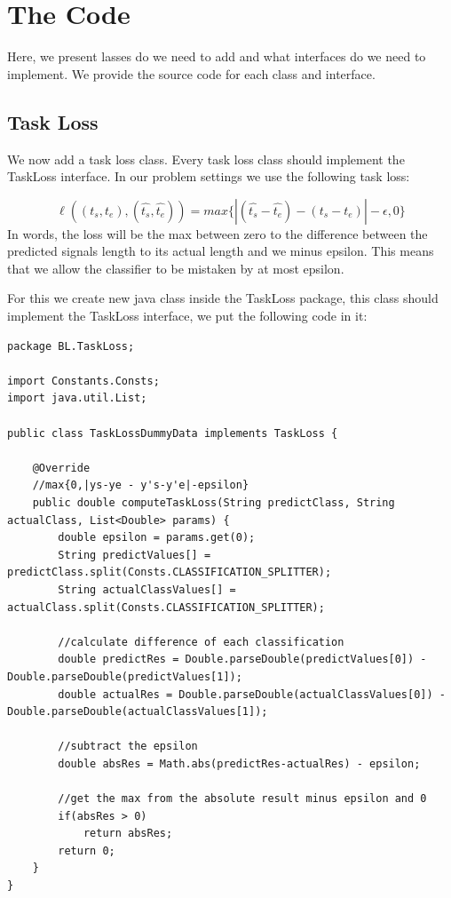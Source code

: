 \documentclass[11pt, oneside]{article}   	%
\begin{document}
\section{The Code}
Here, we present        lasses do we need to add and what interfaces do we need to implement. We provide the source code for each class and interface.
\subsection{Task Loss}
We now add a task loss class. Every task loss class should implement the TaskLoss interface. In our problem settings we use the following task loss: 

\begin{equation}
\label{eq:loss}
\ell ((t_{s}, t_{e}),(\hat{t_{s}}, \hat{t_{e}})) = max{\{|(\hat{t_{s}}-\hat{t_{e}}) - (t_{s} - t_{e})| - \epsilon ,0\}}
\end{equation} 
In words, the loss will be the max between zero to the difference between the predicted signals length to its actual length and we minus epsilon. This means that we allow the classifier to be mistaken by at most epsilon.

For this we create new java class inside the TaskLoss package, this class should implement the TaskLoss interface, we put the following code in it:
\begin{lstlisting}
package BL.TaskLoss;

import Constants.Consts;
import java.util.List;

public class TaskLossDummyData implements TaskLoss {

	@Override
	//max{0,|ys-ye - y's-y'e|-epsilon}
	public double computeTaskLoss(String predictClass, String actualClass, List<Double> params) {
        double epsilon = params.get(0);
		String predictValues[] = predictClass.split(Consts.CLASSIFICATION_SPLITTER);
		String actualClassValues[] = actualClass.split(Consts.CLASSIFICATION_SPLITTER);
	
		//calculate difference of each classification
		double predictRes = Double.parseDouble(predictValues[0]) - Double.parseDouble(predictValues[1]);
		double actualRes = Double.parseDouble(actualClassValues[0]) - Double.parseDouble(actualClassValues[1]);
		
		//subtract the epsilon		
		double absRes = Math.abs(predictRes-actualRes) - epsilon;
		
		//get the max from the absolute result minus epsilon and 0
		if(absRes > 0)
			return absRes;
		return 0;
	}
}
\end{lstlisting}
\end{document}
